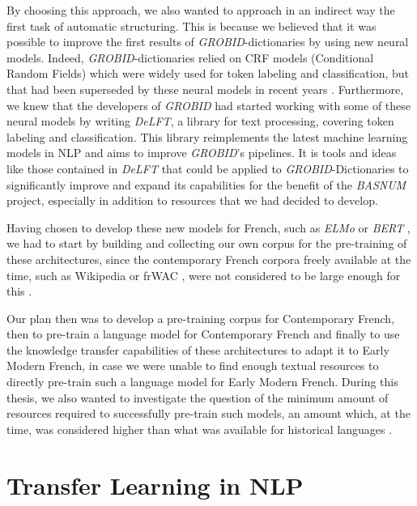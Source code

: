 By choosing this approach, we also wanted to approach in an indirect way the first task of automatic structuring. This is because we believed that it was possible to improve the first results of \emph{GROBID}-dictionaries by using new neural models. Indeed, \emph{GROBID}-dictionaries relied on CRF models (Conditional Random Fields) \citep{lafferty-etal-2001-conditional} which were widely used for token labeling and classification, but that had been superseded by these neural models in recent years \citep{lample-etal-2016-neural,devlin-etal-2019-bert}. Furthermore, we knew that the developers of \emph{GROBID} had started working with some of these neural models by writing \emph{DeLFT}, a library for text processing, covering token labeling and classification. This library reimplements the latest machine learning models in NLP \citep{lopez-etal-2018-delft} and aims to improve \emph{GROBID}'s pipelines. It is tools and ideas like those contained in \emph{DeLFT} that could be applied to \emph{GROBID}-Dictionaries to significantly improve and expand its capabilities for the benefit of the \emph{BASNUM} project, especially in addition to resources that we had decided to develop.


Having chosen to develop these new models for French, such as \emph{ELMo} \citep{peters-etal-2018-deep} or \emph{BERT} \citep{devlin-etal-2019-bert}, we had to start by building and collecting our own corpus for the pre-training of these architectures, since the contemporary French corpora freely available at the time, such as Wikipedia or frWAC \citep{baroni-etal-2009-the}, were not considered to be large enough for this \citep{liu-etal-2019-roberta}.

Our plan then was to develop a pre-training corpus for Contemporary French, then to pre-train a language model for Contemporary French and finally to use the knowledge transfer capabilities of these architectures to adapt it to Early Modern French, in case we were unable to find enough textual resources to directly pre-train such a language model for Early Modern French. During this thesis, we also wanted to investigate the question of the minimum amount of resources required to successfully pre-train such models, an amount which, at the time, was considered higher than what was available for historical languages \citep{peters-etal-2018-deep,liu-etal-2019-roberta}.

\section{Transfer Learning in NLP}

